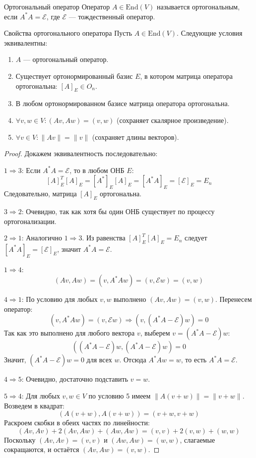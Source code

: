 \begin{Definition}{Ортогональный оператор}{}
	Оператор $A \in \mathrm{End}(V)$ называется ортогональным, если $A^* A = \mathcal{E}$, где $\mathcal{E}$ — тождественный оператор.
\end{Definition}

\begin{Proposition}{Свойства ортогонального оператора}{}
	Пусть $A \in \mathrm{End}(V)$. Следующие условия эквивалентны:
	\begin{enumerate}
		\item $A$ — ортогональный оператор.
		\item Существует ортонормированный базис $E$, в котором матрица оператора ортогональна: $[A]_E \in O_n$.
		\item В любом ортонормированном базисе матрица оператора ортогональна.
		\item $\forall v, w \in V: (Av, Aw) = (v, w)$ (сохраняет скалярное произведение).
		\item $\forall v \in V: \|Av\| = \|v\|$ (сохраняет длины векторов).
	\end{enumerate}
\end{Proposition}

\begin{proof}
	Докажем эквивалентность последовательно:
	
	\textbf{$1 \Rightarrow 3$}:
	Если $A^* A = \mathcal{E}$, то в любом ОНБ $E$:
	\[
	[A]_E^T [A]_E = [A^*]_E [A]_E = [A^* A]_E = [\mathcal{E}]_E = E_n
	\]
	Следовательно, матрица $[A]_E$ ортогональна.
	
	\textbf{$3 \Rightarrow 2$}:
	Очевидно, так как хотя бы один ОНБ существует по процессу ортогонализации.
	
	\textbf{$2 \Rightarrow 1$}:
	Аналогично $1 \Rightarrow 3$. Из равенства $[A]_E^T [A]_E = E_n$ следует $[A^* A]_E = [\mathcal{E}]_E$, значит $A^* A = \mathcal{E}$.
	
	\textbf{$1 \Rightarrow 4$}:
	\[
	(Av, Aw) = (v, A^* A w) = (v, \mathcal{E} w) = (v, w)
	\]
	
	\textbf{$4 \Rightarrow 1$}:
	По условию для любых $v, w$ выполнено $(Av, Aw) = (v, w)$. Перенесем оператор:
	\[
	(v, A^* A w) = (v, \mathcal{E} w) \Rightarrow (v, (A^* A - \mathcal{E}) w) = 0
	\]
	Так как это выполнено для любого вектора $v$, выберем $v = (A^* A - \mathcal{E}) w$:
	\[
	((A^* A - \mathcal{E}) w, (A^* A - \mathcal{E}) w) = 0
	\]
	Значит, $(A^* A - \mathcal{E}) w = 0$ для всех $w$. Отсюда $A^* A w = w$, то есть $A^* A = \mathcal{E}$.
	
	\textbf{$4 \Rightarrow 5$}:
	Очевидно, достаточно подставить $v = w$.
	
	\textbf{$5 \Rightarrow 4$}:
	Для любых $v, w \in V$ по условию 5 имеем $\|A(v+w)\| = \|v+w\|$. Возведем в квадрат:
	\[
	(A(v+w), A(v+w)) = (v+w, v+w)
	\]
	Раскроем скобки в обеих частях по линейности:
	\[
	(Av, Av) + 2(Av, Aw) + (Aw, Aw) = (v, v) + 2(v, w) + (w, w)
	\]
	Поскольку $(Av, Av) = (v, v)$ и $(Aw, Aw) = (w, w)$, слагаемые сокращаются, и остаётся $(Av, Aw) = (v, w)$.
\end{proof}

